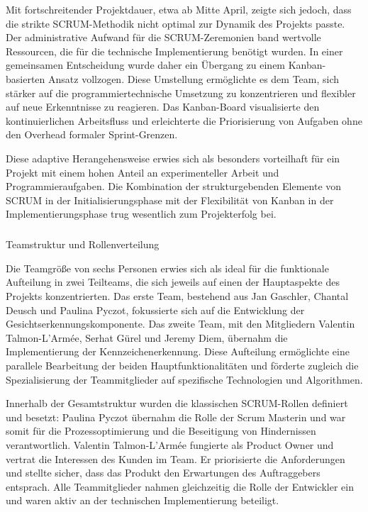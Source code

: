 Mit fortschreitender Projektdauer, etwa ab Mitte April, zeigte sich jedoch, dass die strikte SCRUM-Methodik nicht optimal zur Dynamik des Projekts passte. Der administrative Aufwand für die SCRUM-Zeremonien band wertvolle Ressourcen, die für die technische Implementierung benötigt wurden. In einer gemeinsamen Entscheidung wurde daher ein Übergang zu einem Kanban-basierten Ansatz vollzogen. Diese Umstellung ermöglichte es dem Team, sich stärker auf die programmiertechnische Umsetzung zu konzentrieren und flexibler auf neue Erkenntnisse zu reagieren. Das Kanban-Board visualisierte den kontinuierlichen Arbeitsfluss und erleichterte die Priorisierung von Aufgaben ohne den Overhead formaler Sprint-Grenzen.

Diese adaptive Herangehensweise erwies sich als besonders vorteilhaft für ein Projekt mit einem hohen Anteil an experimenteller Arbeit und Programmieraufgaben. Die Kombination der strukturgebenden Elemente von SCRUM in der Initialisierungsphase mit der Flexibilität von Kanban in der Implementierungsphase trug wesentlich zum Projekterfolg bei.



\subparagraph{}{Teamstruktur und Rollenverteilung}

Die Teamgröße von sechs Personen erwies sich als ideal für die funktionale Aufteilung in zwei Teilteams, die sich jeweils auf einen der Hauptaspekte des Projekts konzentrierten. Das erste Team, bestehend aus Jan Gaschler, Chantal Deusch und Paulina Pyczot, fokussierte sich auf die Entwicklung der Gesichtserkennungskomponente. Das zweite Team, mit den Mitgliedern Valentin Talmon-L'Armée, Serhat Gürel und Jeremy Diem, übernahm die Implementierung der Kennzeichenerkennung. Diese Aufteilung ermöglichte eine parallele Bearbeitung der beiden Hauptfunktionalitäten und förderte zugleich die Spezialisierung der Teammitglieder auf spezifische Technologien und Algorithmen.

Innerhalb der Gesamtstruktur wurden die klassischen SCRUM-Rollen definiert und besetzt: Paulina Pyczot übernahm die Rolle der Scrum Masterin und war somit für die Prozessoptimierung und die Beseitigung von Hindernissen verantwortlich. Valentin Talmon-L'Armée fungierte als Product Owner und vertrat die Interessen des Kunden im Team. Er priorisierte die Anforderungen und stellte sicher, dass das Produkt den Erwartungen des Auftraggebers entsprach. Alle Teammitglieder nahmen gleichzeitig die Rolle der Entwickler ein und waren aktiv an der technischen Implementierung beteiligt.

